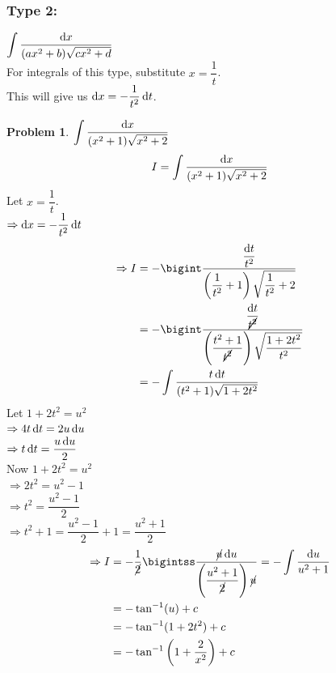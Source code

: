 \documentclass[14]{article}
\theoremstyle{definition}
\newtheorem{prob}{Problem}
\theoremstyle{case}
\begin{document}
\subsubsection{Type 2:}
$\displaystyle \int \dfrac{\dif x}{(ax^2 + b)\sqrt{cx^2 + d}}$\\
For integrals of this type, substitute $x = \dfrac1{t}$.\\
This will give us $\dif x = -\dfrac1{t^2} \dif t$.
\begin{prob}
$\displaystyle \int \dfrac{\dif x}{(x^2 + 1)\sqrt{x^2 + 2}}$
\[I = \int \dfrac{\dif x}{(x^2 + 1)\sqrt{x^2 + 2}}\]
Let $x = \dfrac1{t}$.\\
$\Rightarrow \dif x = -\dfrac1{t^2} \dif t$
\begin{align*}
\Rightarrow I &= - \bigint \dfrac{\dfrac{\dif t}{t^2}}{\left( \dfrac1{t^2} + 1 \right) \sqrt{\dfrac1{t^2} + 2}}\\
&= - \bigint \dfrac{\dfrac{\dif t}{\cancel{t^2}}}{\left( \dfrac{t^2 + 1}{\cancel{t^2}} \right) \sqrt{\dfrac{1 + 2t^2}{t^2}}}\\
&= - \int \dfrac{t \dif t}{(t^2 + 1)\sqrt{1 + 2t^2}}
\end{align*}
Let $1 + 2t^2 = u^2$\\
$\Rightarrow 4t\dif t = 2u\dif u$\\
$\Rightarrow t \dif t = \dfrac{u \dif u}2$\\
Now $1 + 2t^2 = u^2$\\
$\Rightarrow 2t^2 = u^2 - 1$\\
$\Rightarrow t^2 = \dfrac{u^2 - 1}{2}$\\
$\Rightarrow t^2 + 1 = \dfrac{u^2 - 1}{2} + 1 = \dfrac{u^2 + 1}2$
\begin{align*}
\Rightarrow I &= -\dfrac1{\cancel{2}} \bigintss \dfrac{\cancel{u} \dif u}{\left(\dfrac{u^2 + 1}{\cancel{2}}\right)\cancel{u}} = -\int \dfrac{\dif u}{u^2 + 1}\\
&= - \tan^{-1}(u) + c\\
&= - \tan^{-1}(1 + 2t^2) + c\\
&= - \tan^{-1}\left(1 + \dfrac2{x^2}\right) + c\\
\end{align*}
\end{prob}
\pagebreak
\end{document}
